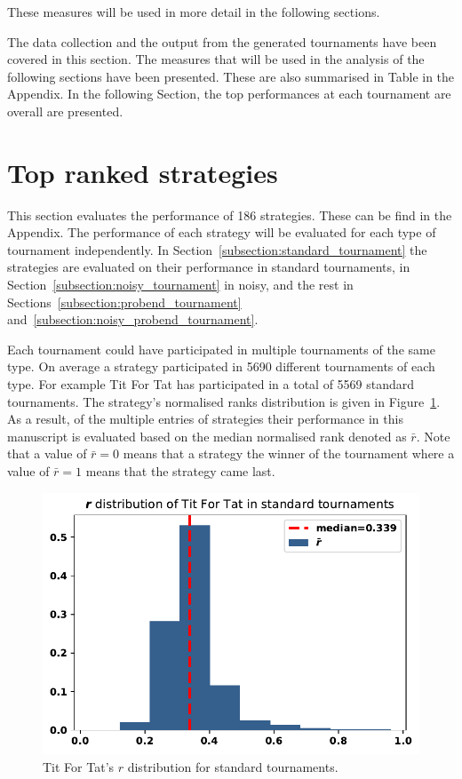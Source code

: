 \documentclass{article}
\begin{document}
These measures will be used in more detail in the following sections.


The data collection and the output from the generated tournaments have been
covered in this section. The measures that will be used in the analysis of the
following sections have been presented. These are also summarised in Table in
the Appendix. In the following Section, the top performances at each tournament
are overall are presented.

\section{Top ranked strategies}\label{section:top_performances}

This section evaluates the performance of 186 strategies. These can be find in
the Appendix. The performance of each strategy will be evaluated for each type
of tournament independently. In Section~\ref{subsection:standard_tournament} the
strategies are evaluated on their performance in standard tournaments, in
Section~\ref{subsection:noisy_tournament} in noisy, and the rest in
Sections~\ref{subsection:probend_tournament}
and~\ref{subsection:noisy_probend_tournament}.

Each tournament could have participated in multiple tournaments of the same
type. On average a strategy participated in 5690 different tournaments of each
type. For example Tit For Tat has participated in a total of 5569 standard
tournaments. The strategy's normalised ranks distribution is given in
Figure~\ref{fig:tit_for_tat_r_distribution}. As a result, of the multiple entries of
strategies their performance in this manuscript is evaluated based on the median
normalised rank denoted as \(\bar{r}\). Note that a value of \(\bar{r} = 0\)
means that a strategy the winner of the tournament where a value of \(\bar{r} = 1\)
means that the strategy came last.

\begin{figure}
    \centering
    \includegraphics[width=.5\textwidth]{../images/tit_for_tat_r_distribution.pdf}
    \caption{Tit For Tat's $r$ distribution for standard tournaments.}
    \label{fig:tit_for_tat_r_distribution}
\end{figure}
\end{document}
